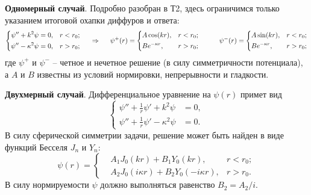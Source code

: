 \textbf{Одномерный случай}. Подробно разобран в Т2, здесь ограничимся только указанием итоговой охапки диффуров и ответа:
\begin{equation*}
    \left\{\begin{aligned}
        \psi'' + k^2 \psi &= 0,  &r < r_0; \\
        \psi'' - \kappa^2 \psi &= 0, &r > r_0;
    \end{aligned}\right.
    \hspace{0.5cm} \Rightarrow \hspace{0.5cm}
    \psi^+(r) = \left\{\begin{aligned}
         & A \cos(k r), &r < r_0; \\
         & B e^{- \kappa r}, &r>r_0;
    \end{aligned}\right.
    \hspace{10 mm}
    \psi^- (r) = 
    \left\{\begin{aligned}
         & A \sin(k r), & r < r_0; \\
        & B e^{- \kappa r}, & r > r_0;
    \end{aligned}\right.
\end{equation*}
где $\psi^+$ и $\psi^-$ -- четное и нечетное решение (в силу симметричности потенциала), а $A$ и $B$ известны из условий нормировки, непрерывности и гладкости. 





\textbf{Двухмерный случай}. Дифференциальное уравнение на $\psi(r)$ примет вид
\begin{equation*}
    \left\{\begin{aligned}
        \psi'' + \tfrac{1}{r} \psi' + k^2 \psi &= 0, \\
        \psi'' +  \tfrac{1}{r} \psi' - \kappa^2 \psi &= 0.
    \end{aligned}\right.
\end{equation*}
В силу сферической симметрии задачи, решение может быть найден в виде функций Бесселя $J_n$ и $Y_n$:
\begin{equation*}
    \psi(r) = \left\{\begin{aligned}
        &A_1 J_0 (k r) + B_1 Y_0 (k r), & r < r_0; \\
        &A_2 J_0 (i \kappa r) + B_2 Y_0 (- i \kappa r), &r > r_0.
    \end{aligned}\right.
\end{equation*}
В силу нормируемости $\psi$ должно выполняться равенство $B_2 = A_2/i$. 

